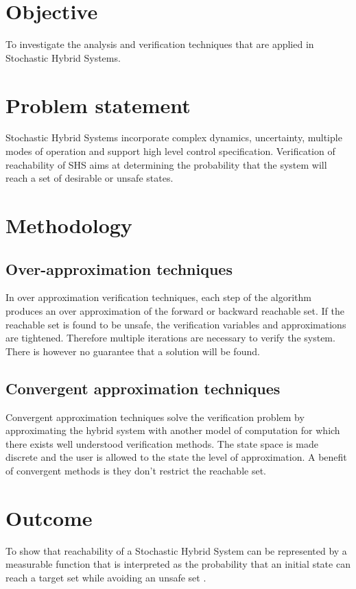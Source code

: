 \documentclass{article}
\begin{document}
\section{Objective}
To investigate the analysis and verification techniques that are applied in Stochastic Hybrid Systems.

\section{Problem statement}
Stochastic Hybrid Systems incorporate complex dynamics, uncertainty, multiple modes of operation and support high level control specification. Verification of reachability of SHS aims at determining the probability that the system will reach a set of desirable or unsafe states.

\section{Methodology}
\subsection{Over-approximation techniques}
In over approximation verification techniques, each step of the algorithm produces an over approximation of the forward or backward reachable set. If the reachable set is found to be unsafe, the verification variables and approximations are tightened. Therefore multiple iterations are necessary to verify the system. There is however no guarantee that a solution will be found.

\subsection{Convergent approximation techniques}
Convergent approximation techniques solve the verification problem by approximating the hybrid system with another model of computation for which there exists well understood verification methods. The state space is made discrete and the user is allowed to the state the level of approximation. A benefit of convergent methods is they don’t restrict the reachable set.

\section{Outcome}
To show that reachability of a Stochastic Hybrid System can be represented by a measurable function that is interpreted as the probability that an initial state can reach a target set while avoiding an unsafe set .
\end{document}
